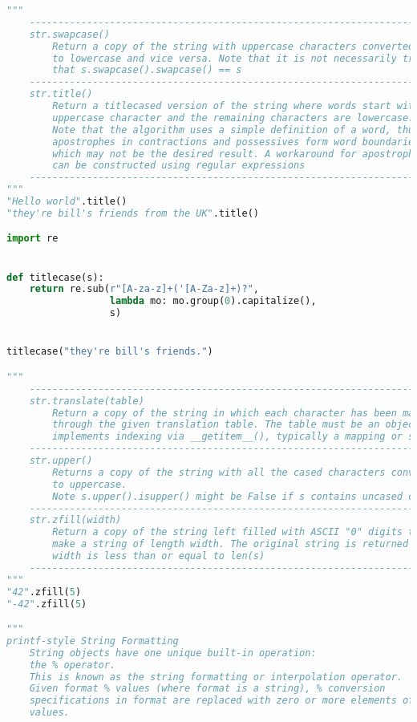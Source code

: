 \documentclass[a4paper,landscape]{report}
\begin{document}
\begin{lstlisting}[language=Python]
"""
    ---------------------------------------------------------------------
    str.swapcase()
        Return a copy of the string with uppercase characters converted
        to lowercase and vice versa. Note that it is not necessarily true
        that s.swapcase().swapcase() == s
    ---------------------------------------------------------------------
    str.title()
        Return a titlecased version of the string where words start with an
        uppercase character and the remaining characters are lowercase.
        Note that the algorithm uses a simple definition of a word, thus
        apostrophes in contractions and possessives form word boundaries
        which may not be the desired result. A workaround for apostrophes
        can be constructed using regular expressions
    ---------------------------------------------------------------------
"""
"Hello world".title()
"they're bill's friends from the UK".title()

import re


def titlecase(s):
    return re.sub(r"[A-za-z]+('[A-Za-z]+)?",
                  lambda mo: mo.group(0).capitalize(),
                  s)


titlecase("they're bill's friends.")

"""
    ---------------------------------------------------------------------
    str.translate(table)
        Return a copy of the string in which each character has been mapped
        through the given translation table. The table must be an object that
        implements indexing via __getitem__(), typically a mapping or sequence.
    ---------------------------------------------------------------------
    str.upper()
        Returns a copy of the string with all the cased characters converted
        to uppercase.
        Note s.upper().isupper() might be False if s contains uncased characters
    ---------------------------------------------------------------------
    str.zfill(width)
        Return a copy of the string left filled with ASCII "0" digits to
        make a string of length width. The original string is returned if
        width is less than or equal to len(s)
    ---------------------------------------------------------------------
"""
"42".zfill(5)
"-42".zfill(5)

"""
printf-style String Formatting
    String objects have one unique built-in operation:
    the % operator.
    This is known as the string formatting or interpolation operator.
    Given format % values (where format is a string), % conversion
    specifications in format are replaced with zero or more elements of
    values.
    

\end{lstlisting}
\end{document}
